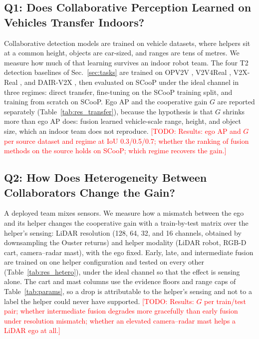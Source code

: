 \documentclass[journal]{IEEEtran}
\newcommand{\todo}[1]{\textcolor{red}{[TODO: #1]}}
\begin{document}
\subsection{Q1: Does Collaborative Perception Learned on Vehicles Transfer Indoors?}
\label{sec:q1_transfer}
Collaborative detection models are trained on vehicle datasets, where
helpers sit at a common height, objects are car-sized, and ranges are
tens of metres. We measure how much of that learning survives an
indoor robot team. The four T2 detection baselines of
Sec.~\ref{sec:tasks} are trained on OPV2V \cite{opv2v}, V2V4Real
\cite{v2v4real}, V2X-Real \cite{v2xreal}, and DAIR-V2X
\cite{dairv2x}, then evaluated on SCooP under the ideal channel in
three regimes: direct transfer, fine-tuning on the SCooP training
split, and training from scratch on SCooP. Ego AP and the cooperative
gain $G$ are reported separately (Table~\ref{tab:res_transfer}),
because the hypothesis is that $G$ shrinks more than ego AP does:
fusion learned vehicle-scale range, height, and object size, which an
indoor team does not reproduce. \todo{Results: ego AP and $G$ per
source dataset and regime at IoU 0.3/0.5/0.7; whether the ranking of
fusion methods on the source holds on SCooP; which regime recovers the
gain.}



\subsection{Q2: How Does Heterogeneity Between Collaborators Change the Gain?}
\label{sec:q2_hetero}
A deployed team mixes sensors. We measure how a mismatch between the
ego and its helper changes the cooperative gain with a train-by-test
matrix over the helper's sensing: LiDAR resolution (128, 64, 32, and
16 channels, obtained by downsampling the Ouster returns) and helper
modality (LiDAR robot, RGB-D cart, camera--radar mast), with the ego
fixed. Early, late, and intermediate fusion are trained on one helper
configuration and tested on every other (Table~\ref{tab:res_hetero}),
under the ideal channel so that the effect is sensing alone. The
cart and mast columns use the evidence floors and range caps of
Table~\ref{tab:params}, so a drop is attributable to the helper's
sensing and not to a label the helper could never have supported.
\todo{Results: $G$ per train/test pair; whether intermediate fusion
degrades more gracefully than early fusion under resolution mismatch;
whether an elevated camera--radar mast helps a LiDAR ego at all.}
\end{document}

